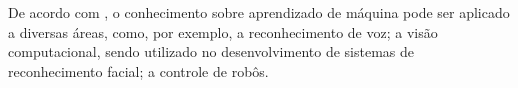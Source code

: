 




De acordo com \cite{Mitchell_discipline}, o conhecimento sobre aprendizado de máquina pode ser aplicado a diversas áreas, como, por exemplo, a reconhecimento de voz; a visão computacional, sendo utilizado no desenvolvimento de sistemas de reconhecimento facial; a controle de robôs.

\cite{ML_debt} 
\cite{ML_know}